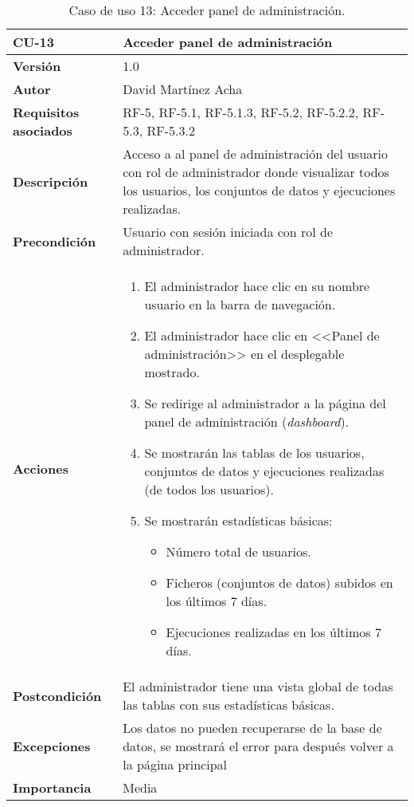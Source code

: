 \begin{table}[p]
	\centering
	\begin{tabularx}{\linewidth}{ p{} p{} }
		\toprule
		\textbf{CU-13}    & \textbf{Acceder panel de administración}\\
		\toprule
		\textbf{Versión}              & 1.0    \\
		\textbf{Autor}                & David Martínez Acha \\
		\textbf{Requisitos asociados} & RF-5, RF-5.1, RF-5.1.3, RF-5.2, RF-5.2.2, RF-5.3, RF-5.3.2\\
		\textbf{Descripción}          & Acceso a al panel de administración del usuario con rol de administrador donde visualizar 
		todos los usuarios, los conjuntos de datos y ejecuciones realizadas.\\
		\textbf{Precondición}         & Usuario con sesión iniciada con rol de administrador. \\
		\textbf{Acciones}             &
		\begin{enumerate}
			\def\labelenumi{\arabic{enumi}.}
			\tightlist
			\item El administrador hace clic en su nombre usuario en la barra de navegación.
			\item El administrador hace clic en <<Panel de administración>> en el desplegable mostrado.
			\item Se redirige al administrador a la página del panel de administración (\textit{dashboard}).
			\item Se mostrarán las tablas de los usuarios, conjuntos de datos y ejecuciones realizadas (de todos los usuarios).
			\item Se mostrarán estadísticas básicas:
			\begin{itemize}
				\item Número total de usuarios.
				\item Ficheros (conjuntos de datos) subidos en los últimos 7 días.
				\item Ejecuciones realizadas en los últimos 7 días.
			\end{itemize}
		\end{enumerate}\\
		\textbf{Postcondición}        & El administrador tiene una vista global de todas las tablas con sus estadísticas básicas.\\
		\textbf{Excepciones}          & Los datos no pueden recuperarse de la base de datos, se mostrará el error para después volver a la página principal\\
		\textbf{Importancia}          & Media \\
		\bottomrule
	\end{tabularx}
	\caption{Caso de uso 13: Acceder panel de administración.}
\end{table}

